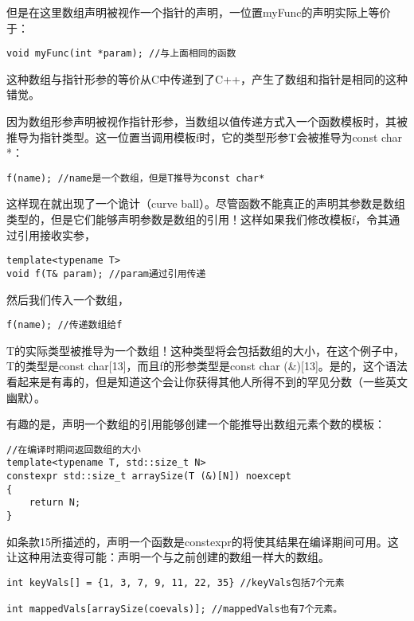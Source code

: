 但是在这里数组声明被视作一个指针的声明，一位置myFunc的声明实际上等价于：

\begin{lstlisting}
void myFunc(int *param); //与上面相同的函数
\end{lstlisting}

这种数组与指针形参的等价从C中传递到了C++，产生了数组和指针是相同的这种错觉。

因为数组形参声明被视作指针形参，当数组以值传递方式入一个函数模板时，其被推导为指针类型。这一位置当调用模板f时，它的类型形参T会被推导为const char *：

\begin{lstlisting}
f(name); //name是一个数组，但是T推导为const char*
\end{lstlisting}

这样现在就出现了一个诡计（curve ball）。尽管函数不能真正的声明其参数是数组类型的，但是它们能够声明参数是数组的引用！这样如果我们修改模板f，令其通过引用接收实参，

\begin{lstlisting}
template<typename T>
void f(T& param); //param通过引用传递
\end{lstlisting}

然后我们传入一个数组，

\begin{lstlisting}
f(name); //传递数组给f
\end{lstlisting}

T的实际类型被推导为一个数组！这种类型将会包括数组的大小，在这个例子中，T的类型是const char[13]，而且f的形参类型是const char (\&)[13]。是的，这个语法看起来是有毒的，但是知道这个会让你获得其他人所得不到的罕见分数（一些英文幽默）。

有趣的是，声明一个数组的引用能够创建一个能推导出数组元素个数的模板：

\begin{lstlisting}
//在编译时期间返回数组的大小
template<typename T, std::size_t N>
constexpr std::size_t arraySize(T (&)[N]) noexcept
{
	return N;
}
\end{lstlisting}

如条款15所描述的，声明一个函数是constexpr的将使其结果在编译期间可用。这让这种用法变得可能：声明一个与之前创建的数组一样大的数组。

\begin{lstlisting}
int keyVals[] = {1, 3, 7, 9, 11, 22, 35} //keyVals包括7个元素

int mappedVals[arraySize(coevals)]; //mappedVals也有7个元素。
\end{lstlisting}

